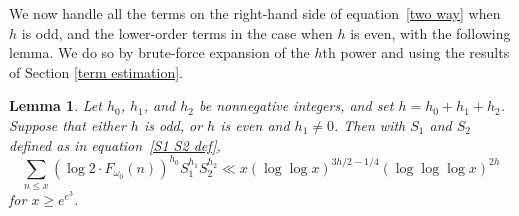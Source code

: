 \documentclass[12pt,reqno]{amsart}
\newtheorem{lemma}[theorem]{Lemma}
\theoremstyle{definition}
\begin{document}
We now handle all the terms on the right-hand side of equation~\eqref{two way} when $h$ is odd, and the lower-order terms in the case when $h$ is even, with the following lemma. We do so by brute-force expansion of the $h$th power and using the results of Section \ref{term estimation}.

\begin{lemma}\label{lower order terms}
Let $h_0$, $h_1$, and $h_2$ be nonnegative integers, and set $h=h_0+h_1+h_2$. Suppose that either $h$ is odd, or $h$ is even and $h_1\ne0$. Then with $S_1$ and $S_2$ defined as in equation~\eqref{S1 S2 def},
\[
\sum_{n \leq x} ( \log 2 \cdot F_{\omega_0}(n))^{h_0} S_1^{h_1}S_2^{h_2} \ll x(\log\log x)^{3h/2-1/4}(\log\log\log x)^{2h}
\]
for $x\ge e^{e^3}$.
\end{lemma}
\end{document}
